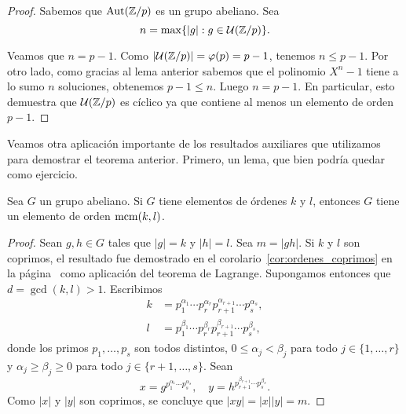 \begin{proof}
Sabemos que $\operatorname{Aut}(\mathbb{Z}/p)$ es un grupo abeliano. Sea 
\[
n=\max\{|g|:g\in\mathcal{U}(\mathbb{Z}/p)\}.
\] 

Veamos que $n=p-1$. Como $|\mathcal{U}(\mathbb{Z}/p)|=\varphi(p)=p-1$, tenemos $n\leq p-1$. Por otro lado, como gracias al lema anterior sabemos que el polinomio $X^n-1$ tiene a lo sumo $n$ soluciones, obtenemos $p-1\leq n$. Luego $n=p-1$. En particular, esto demuestra que $\mathcal{U}(\mathbb{Z}/p)$ es cíclico ya que contiene al menos un elemento de orden $p-1$.  
\end{proof}

Veamos otra aplicación importante de los resultados auxiliares que utilizamos para demostrar el teorema anterior. Primero, un lema, que bien podría quedar como ejercicio.

\begin{lemma}
Sea $G$ un grupo abeliano. Si $G$ tiene elementos de órdenes $k$ y $l$, entonces $G$ tiene un elemento de orden $\operatorname{mcm}(k,l)$. 
\end{lemma}

\begin{proof}
Sean $g,h\in G$ tales que $|g|=k$ y $|h|=l$. Sea 
$m=|gh|$. Si $k$ y $l$ son coprimos, 
el resultado fue demostrado en el corolario~\ref{cor:ordenes_coprimos} en la página~\pageref{cor:ordenes_coprimos} como aplicación del teorema de Lagrange. 
Supongamos entonces que $d=\gcd(k,l)>1$. Escribimos
\begin{align*}
k&=p_1^{\alpha_1}\cdots p_r^{\alpha_r} p_{r+1}^{\alpha_{r+1}}\cdots p_s^{\alpha_s},\\
l&=p_1^{\beta_1}\cdots p_r^{\beta_r} p_{r+1}^{\beta_{r+1}}\cdots p_s^{\beta_s},
\end{align*}
donde los primos $p_1,\dots,p_s$ son todos distintos, $0\leq\alpha_j<\beta_j$ para todo $j\in\{1,\dots,r\}$ y $\alpha_j\geq\beta_j\geq0$ para todo $j\in\{r+1,\dots,s\}$. Sean
\[
x=g^{p_1^{\alpha_1}\cdots p_s^{\alpha_s}},
\quad
y=h^{p_{r+1}^{\beta_{r+1}}\cdots p_s^{\beta_s}}.
\]
Como $|x|$ y $|y|$ son coprimos, se concluye que
$|xy|=|x||y|=m$.
\end{proof}

